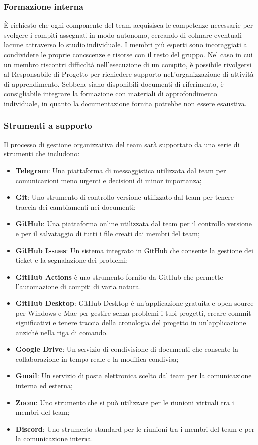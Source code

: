 \subsubsection{Formazione interna}
È richiesto che ogni componente del team acquisisca le competenze necessarie per svolgere i compiti assegnati in modo autonomo, cercando di colmare eventuali lacune attraverso lo studio individuale. I membri più esperti sono incoraggiati a condividere le proprie conoscenze e risorse con il resto del gruppo. Nel caso in cui un membro riscontri difficoltà nell'esecuzione di un compito, è possibile rivolgersi al Responsabile di Progetto per richiedere supporto nell'organizzazione di attività di apprendimento. Sebbene siano disponibili documenti di riferimento, è consigliabile integrare la formazione con materiali di approfondimento individuale, in quanto la documentazione fornita potrebbe non essere esaustiva.

\subsubsection{Strumenti a supporto}
Il processo di gestione organizzativa del team sarà supportato da una serie di strumenti che includono:
\begin{itemize}
    \item \textbf{Telegram}: Una piattaforma di messaggistica utilizzata dal team per comunicazioni meno urgenti e decisioni di minor importanza;
    \item \textbf{Git}: Uno strumento di controllo versione utilizzato dal team per tenere traccia dei cambiamenti nei documenti;
    \item \textbf{GitHub}: Una piattaforma online utilizzata dal team per il controllo versione e per il salvataggio di tutti i file creati dai membri del team;
    \item \textbf{GitHub Issues}: Un sistema integrato in GitHub che consente la gestione dei ticket e la segnalazione dei problemi;
    \item \textbf{GitHub Actions} è uno strumento fornito da GitHub che permette l’automazione di compiti di varia natura.
    \item \textbf{GitHub Desktop}: GitHub Desktop è un'applicazione gratuita e open source per Windows e Mac per gestire senza problemi i tuoi progetti, creare commit significativi e tenere traccia della cronologia del progetto in un'applicazione anziché nella riga di comando.
    \item \textbf{Google Drive}: Un servizio di condivisione di documenti che consente la collaborazione in tempo reale e la modifica condivisa;
    \item \textbf{Gmail}: Un servizio di posta elettronica scelto dal team per la comunicazione interna ed esterna;
    \item \textbf{Zoom}: Uno strumento che si può utilizzare per le riunioni virtuali tra i membri del team;
    \item \textbf{Discord}: Uno strumento standard per le riunioni tra i membri del team e per la comunicazione interna.
\end{itemize}